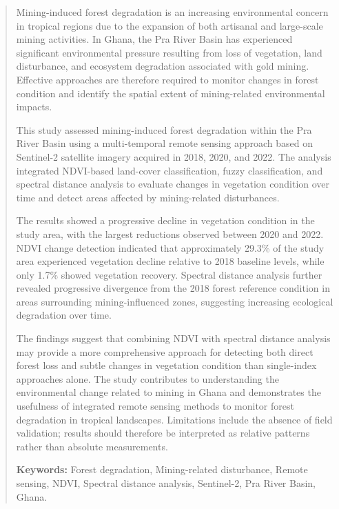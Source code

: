 \documentclass[a4paper,12pt]{report}
\begin{document}
 
\begin{abstract}

Mining-induced forest degradation is an increasing environmental concern in tropical regions due to the expansion of both artisanal and large-scale mining activities. In Ghana, the Pra River Basin has experienced significant environmental pressure resulting from loss of vegetation, land disturbance, and ecosystem degradation associated with gold mining. Effective approaches are therefore required to monitor changes in forest condition and identify the spatial extent of mining-related environmental impacts.

This study assessed mining-induced forest degradation within the Pra River Basin using a multi-temporal remote sensing approach based on Sentinel-2 satellite imagery acquired in 2018, 2020, and 2022. The analysis integrated NDVI-based land-cover classification, fuzzy classification, and spectral distance analysis to evaluate changes in vegetation condition over time and detect areas affected by mining-related disturbances.

The results showed a progressive decline in vegetation condition in the study area, with the largest reductions observed between 2020 and 2022. NDVI change detection indicated that approximately 29.3\% of the study area experienced vegetation decline relative to 2018 baseline levels, while only 1.7\% showed vegetation recovery. Spectral distance analysis further revealed progressive divergence from the 2018 forest reference condition in areas surrounding mining-influenced zones, suggesting increasing ecological degradation over time.

The findings suggest that combining NDVI with spectral distance analysis may provide a more comprehensive approach for detecting both direct forest loss and subtle changes in vegetation condition than single-index approaches alone. The study contributes to understanding the environmental change related to mining in Ghana and demonstrates the usefulness of integrated remote sensing methods to monitor forest degradation in tropical landscapes. Limitations include the absence of field validation; results should therefore be interpreted as relative patterns rather than absolute measurements.

\textbf{Keywords:} Forest degradation, Mining-related disturbance, Remote sensing, NDVI, Spectral distance analysis, Sentinel-2, Pra River Basin, Ghana.

\end{abstract}
\end{document}
